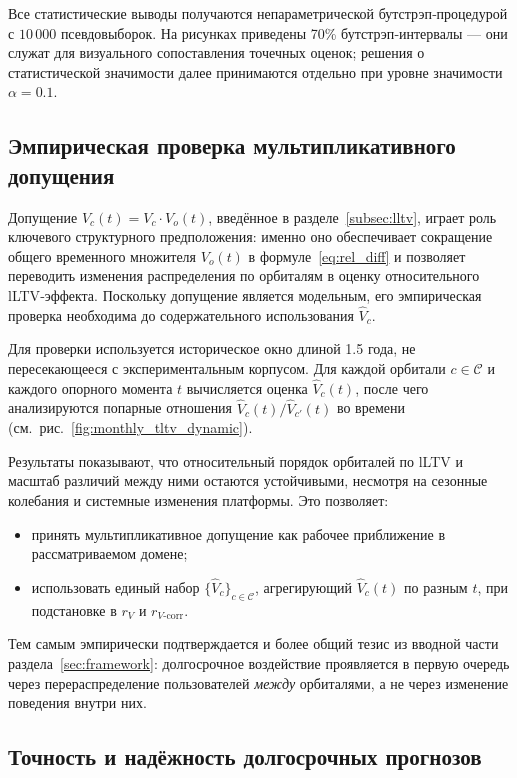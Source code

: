 Все статистические выводы получаются непараметрической
бутстрэп‑процедурой с $10\,000$ псевдовыборок. На рисунках приведены
70\% бутстрэп‑интервалы — они служат для визуального сопоставления
точечных оценок; решения о статистической значимости далее принимаются
отдельно при уровне значимости $\alpha = 0.1$.


\subsection{Эмпирическая проверка мультипликативного допущения}
\label{subsec:assumption_check}

Допущение $V_c(t) = V_c \cdot V_o(t)$, введённое в
разделе~\ref{subsec:lltv}, играет роль ключевого структурного
предположения: именно оно обеспечивает сокращение общего временного
множителя $V_o(t)$ в формуле~\eqref{eq:rel_diff} и позволяет
переводить изменения распределения по орбиталям в оценку
относительного lLTV‑эффекта. Поскольку допущение является модельным,
его эмпирическая проверка необходима до содержательного использования
$\hat{V}_c$.

Для проверки используется историческое окно длиной 1.5 года, не
пересекающееся с экспериментальным корпусом. Для каждой орбитали
$c\in\mathcal{C}$ и каждого опорного момента $t$ вычисляется оценка
$\hat{V}_c(t)$, после чего анализируются попарные отношения
$\hat{V}_c(t)/\hat{V}_{c'}(t)$ во времени
(см.~рис.~\ref{fig:monthly_tltv_dynamic}).

Результаты показывают, что относительный порядок орбиталей по lLTV и
масштаб различий между ними остаются устойчивыми, несмотря на
сезонные колебания и системные изменения платформы. Это позволяет:
\begin{itemize}
    \item принять мультипликативное допущение как рабочее
          приближение в рассматриваемом домене;
    \item использовать единый набор $\{\hat{V}_c\}_{c\in\mathcal{C}}$,
          агрегирующий $\hat{V}_c(t)$ по разным $t$, при подстановке
          в $r_V$ и $r_{V\text{-corr}}$.
\end{itemize}

Тем самым эмпирически подтверждается и более общий тезис из
вводной части раздела~\ref{sec:framework}: долгосрочное воздействие
проявляется в первую очередь через перераспределение пользователей
\textit{между} орбиталями, а не через изменение поведения внутри них.


\subsection{Точность и надёжность долгосрочных прогнозов}
\label{subsec:results_prediction}

